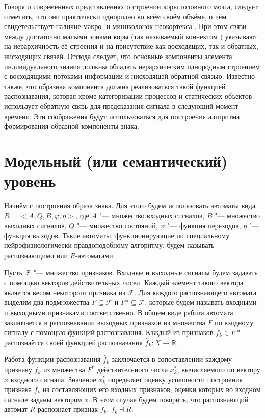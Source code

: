 \documentclass[a4paper, 12pt]{article}
\theoremstyle{plain}
\begin{document}
	Говоря о современных представлениях о строении коры головного мозга, следует отметить, что оно практически однородно во всём своём объёме, о чём свидетельствует наличие макро- и миниколонок неокортекса \cite{Mountcastle1998,Rockland2010}. При этом связи между достаточно малыми зонами коры (так называемый коннектом \cite{Zador2012}) указывают на иерархичность её строения и на присутствие как восходящих, так и обратных, нисходящих связей. Отсюда следует, что основные компоненты элемента индивидуального знания должны обладать иерархическим однородным строением с восходящими потоками информации и нисходящей обратной связью. Известно также, что образная компонента должна реализоваться такой функцией распознавания, которая кроме категоризации процессов и статических объектов использует обратную связь для предсказания сигнала в следующий момент времени. Эти соображения будут использоваться для построения алгоритма формирования образной компоненты знака.
	
	\section{Модельный (или семантический) уровень}\label{sect:seman}
	Начнём с построения образа знака. Для этого будем использовать автоматы вида  $R=<A,Q,B,\varphi, \eta>$, где $A$ "--- множество входных сигналов, $B$ "--- множество выходных сигналов, $Q$ "--- множество состояний, $\varphi$ "--- функция переходов, $\eta$ "--- функция выходов. Такие автоматы, функционирующие по специальному нейрофизиологически правдоподобному алгоритму, будем называть распознающими или $R$-автоматами. 
	
	Пусть $\mathcal F$ "--- множество признаков. Входные и выходные сигналы будем задавать с помощью  векторов действительных чисел. Каждый элемент такого вектора является весом некоторого признака из $\mathcal F$. Для каждого распознающего автомата выделим два подмножества $F\subseteq\mathcal F$ и $F*\subseteq\mathcal F$, которые будем называть входными и выходными признаками соответственно. В общем виде работа автомата заключается в распознавании выходных признаков из множества $F$ по входному сигналу с помощью функций распознавания. Каждый из признаков $f_k\in F*$ распознаётся своей функцией распознавания $\hat f_k: X\rightarrow \mathbb R$.
	
	Работа функции распознавания $\hat f_k$ заключается в сопоставлении каждому признаку $f_k$ из множества $F^*$ действительного числа $x_k^*$, вычисляемого по вектору $\bar x$ входного сигнала. Значение $x_k^*$ определяет оценку успешности построения признака $f_k$ из составляющих его входных признаков, оценки которых во входном сигнале заданы вектором $\bar x$. В этом случае будем говорить, что распознающий автомат $R$ распознает признак $f_k$: $f_k\dashv R$.
	
\end{document}
